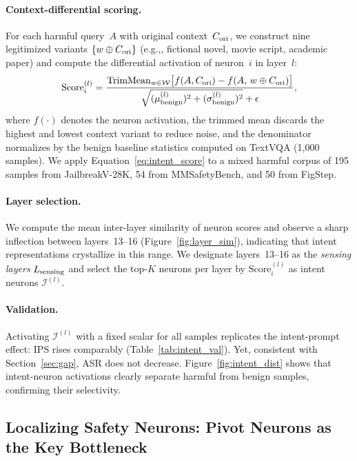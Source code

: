 \documentclass{article}
\newcommand{\eg}{e.g.,\xspace}
\begin{document}
\paragraph{Context-differential scoring.}
For each harmful query~$A$ with original context~$C_{\rm ori}$,
we construct nine legitimized variants $\{w \oplus C_{\rm ori}\}$
(\eg, fictional novel, movie script, academic paper) and compute
the differential activation of neuron~$i$ in layer~$l$:
\begin{equation}
  \mathrm{Score}_i^{(l)} =
  \frac{
    \mathrm{TrimMean}_{w \in \mathcal{W}}
    \bigl[ f(A, C_{\rm ori}) - f(A,\, w \oplus C_{\rm ori}) \bigr]
  }{
    \sqrt{(\mu_{\rm benign}^{(l)})^2 + (\sigma_{\rm benign}^{(l)})^2}
    + \epsilon
  },
  \label{eq:intent_score}
\end{equation}
where $f(\cdot)$ denotes the neuron activation, the trimmed mean
discards the highest and lowest context variant to reduce noise,
and the denominator normalizes by the benign baseline statistics
computed on TextVQA (1{,}000 samples).
We apply Equation~\ref{eq:intent_score} to a mixed harmful corpus
of 195 samples from JailbreakV-28K, 54 from MMSafetyBench, and
50 from FigStep.

\paragraph{Layer selection.}
We compute the mean inter-layer similarity of neuron scores and
observe a sharp inflection between layers~13--16 (Figure~\ref{fig:layer_sim}),
indicating that intent representations crystallize in this range.
We designate layers~13--16 as the \emph{sensing layers}
$L_{\rm sensing}$ and select the top-$K$ neurons per layer by
$\mathrm{Score}_i^{(l)}$ as intent neurons
$\mathcal{I}^{(l)}$.

\paragraph{Validation.}
Activating $\mathcal{I}^{(l)}$ with a fixed scalar for all
samples replicates the intent-prompt effect:
IPS rises comparably (Table~\ref{tab:intent_val}).
Yet, consistent with Section~\ref{sec:gap}, ASR does not decrease.
Figure~\ref{fig:intent_dist} shows that intent-neuron activations
clearly separate harmful from benign samples, confirming their
selectivity.

\subsection{Localizing Safety Neurons: Pivot Neurons as the Key Bottleneck}
\label{sec:safety_neurons}
\end{document}
